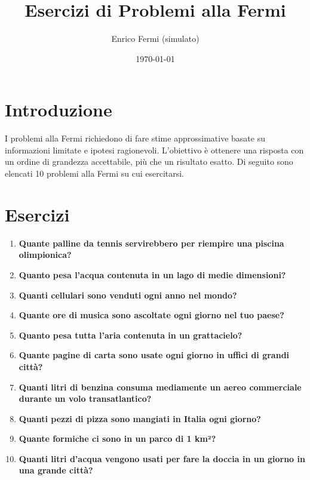 \documentclass[a4paper,10pt]{article}
\title{Esercizi di Problemi alla Fermi}
\author{Enrico Fermi (simulato)}
\date{\today}
\begin{document}
\maketitle

\section*{Introduzione}
I problemi alla Fermi richiedono di fare stime approssimative basate su informazioni limitate e ipotesi ragionevoli. L'obiettivo è ottenere una risposta con un ordine di grandezza accettabile, più che un risultato esatto. Di seguito sono elencati 10 problemi alla Fermi su cui esercitarsi.

\section*{Esercizi}
\begin{enumerate}
    \item \textbf{Quante palline da tennis servirebbero per riempire una piscina olimpionica?}
    
    \item \textbf{Quanto pesa l'acqua contenuta in un lago di medie dimensioni?}
    
    \item \textbf{Quanti cellulari sono venduti ogni anno nel mondo?}
    
    \item \textbf{Quante ore di musica sono ascoltate ogni giorno nel tuo paese?}
    
    \item \textbf{Quanto pesa tutta l'aria contenuta in un grattacielo?}
    
    \item \textbf{Quante pagine di carta sono usate ogni giorno in uffici di grandi città?}
    
    \item \textbf{Quanti litri di benzina consuma mediamente un aereo commerciale durante un volo transatlantico?}
    
    \item \textbf{Quanti pezzi di pizza sono mangiati in Italia ogni giorno?}
    
    \item \textbf{Quante formiche ci sono in un parco di 1 km²?}
    
    \item \textbf{Quanti litri d'acqua vengono usati per fare la doccia in un giorno in una grande città?}
\end{enumerate}
\end{document}
